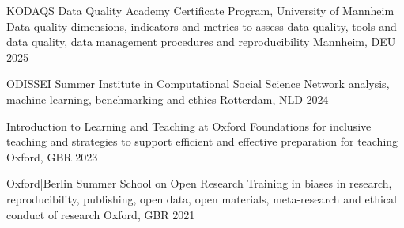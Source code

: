





\vspace{1mm}

\begin{cvhonors}
\cvhonor
{KODAQS Data Quality Academy Certificate Program, University of Mannheim} 
{Data quality dimensions, indicators and metrics to assess data quality, tools and data quality, data management procedures and reproducibility} 
{Mannheim, DEU}
{2025}
\end{cvhonors}

\vspace{1mm}

\begin{cvhonors}
\cvhonor
{ODISSEI Summer Institute in Computational Social Science} 
{Network analysis, machine learning, benchmarking and ethics} 
{Rotterdam, NLD}
{2024}
\end{cvhonors}

\vspace{1mm}

\begin{cvhonors}
\cvhonor
{Introduction to Learning and Teaching at Oxford} 
{Foundations for inclusive teaching and strategies to support efficient and effective preparation for teaching} 
{Oxford, GBR}
{2023}
\end{cvhonors}

\vspace{1mm}

\begin{cvhonors}
\cvhonor
{Oxford|Berlin Summer School on Open Research} 
{Training in biases in research, reproducibility, publishing, open data, open materials, meta-research and ethical conduct of research} 
{Oxford, GBR}
{2021}
\end{cvhonors}

\vspace{1mm}

